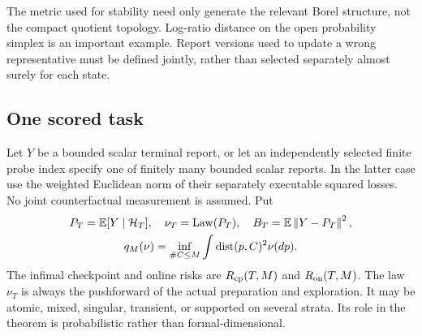 The metric used for stability need only generate the relevant Borel structure, not the compact quotient topology. Log-ratio distance on the open probability simplex is an important example. Report versions used to update a wrong representative must be defined jointly, rather than selected separately almost surely for each state.

\subsection{One scored task}
Let $Y$ be a bounded scalar terminal report, or let an independently selected finite probe index specify one of finitely many bounded scalar reports. In the latter case use the weighted Euclidean norm of their separately executable squared losses. No joint counterfactual measurement is assumed. Put
\begin{equation}\label{eq:task}
 \begin{gathered}
 P_T=\mathbb E[Y\mid\mathcal H_T],\quad \nu_T=\operatorname{Law}(P_T),\quad B_T=\mathbb E\left\lVert Y-P_T\right\rVert^2,\\
 q_M(\nu)=\inf_{\#C\le M}\int\operatorname{dist}(p,C)^2\nu(dp).
 \end{gathered}
\end{equation}
The infimal checkpoint and online risks are $R_{\mathrm{cp}}(T,M)$ and $R_{\mathrm{on}}(T,M)$. The law $\nu_T$ is always the pushforward of the actual preparation and exploration. It may be atomic, mixed, singular, transient, or supported on several strata. Its role in the theorem is probabilistic rather than formal-dimensional.
